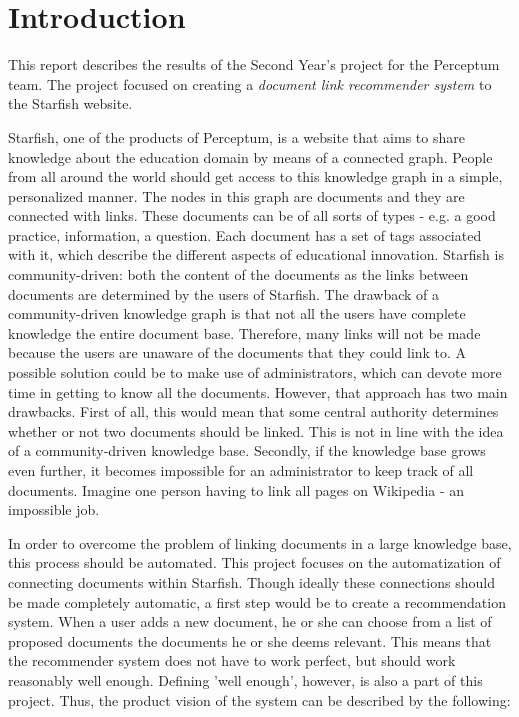 

\section{Introduction}

This report describes the results of the Second Year's project for the Perceptum team. The project focused on creating a \emph{document link recommender system} to the Starfish website. 

Starfish, one of the products of Perceptum, is a website that aims to share knowledge about the education domain by means of a connected graph. People from all around the world should get access to this knowledge graph in a simple, personalized manner. The nodes in this graph are documents and they are connected with links. These documents can be of all sorts of types - e.g. a good practice, information, a question. Each document has a set of tags associated with it, which describe the different aspects of educational innovation. Starfish is community-driven: both the content of the documents as the links between documents are determined by the users of Starfish. The drawback of a community-driven knowledge graph is that not all the users have complete knowledge the entire document base. Therefore, many links will not be made because the users are unaware of the documents that they could link to. A possible solution could be to make use of administrators, which can devote more time in getting to know all the documents. However, that approach has two main drawbacks. First of all, this would mean that some central authority determines whether or not two documents should be linked. This is not in line with the idea of a community-driven knowledge base. Secondly, if the knowledge base grows even further, it becomes impossible for an administrator to keep track of all documents. Imagine one person having to link all pages on Wikipedia - an impossible job. 

In order to overcome the problem of linking documents in a large knowledge base, this process should be automated. This project focuses on the automatization of connecting documents within Starfish. Though ideally these connections should be made completely automatic, a first step would be to create a recommendation system. When a user adds a new document, he or she can choose from a list of proposed documents the documents he or she deems relevant. This means that the recommender system does not have to work perfect, but should work reasonably well enough. Defining 'well enough', however, is also a part of this project. Thus, the product vision of the system can be described by the following:

